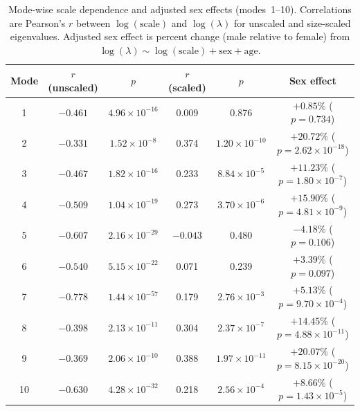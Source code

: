 \documentclass[openacc]{rsproca_new}
\begin{document}
\begin{table}[p]
\centering
\caption{Mode-wise scale dependence and adjusted sex effects (modes~1--10). Correlations are Pearson's $r$ between $\log(\mathrm{scale})$ and $\log(\lambda)$ for unscaled and size-scaled eigenvalues. Adjusted sex effect is percent change (male relative to female) from $\log(\lambda) \sim \log(\mathrm{scale}) + \mathrm{sex} + \mathrm{age}$.}
\label{tab:modes}
\begin{tabular}{cccccc}
\toprule
Mode & $r$ (unscaled) & $p$ & $r$ (scaled) & $p$ & Sex effect \\
\midrule
1 & $-0.461$ & $4.96 \times 10^{-16}$ & 0.009 & 0.876 & $+0.85\%$ ($p=0.734$) \\
2 & $-0.331$ & $1.52 \times 10^{-8}$ & 0.374 & $1.20 \times 10^{-10}$ & $+20.72\%$ ($p=2.62 \times 10^{-18}$) \\
3 & $-0.467$ & $1.82 \times 10^{-16}$ & 0.233 & $8.84 \times 10^{-5}$ & $+11.23\%$ ($p=1.80 \times 10^{-7}$) \\
4 & $-0.509$ & $1.04 \times 10^{-19}$ & 0.273 & $3.70 \times 10^{-6}$ & $+15.90\%$ ($p=4.81 \times 10^{-9}$) \\
5 & $-0.607$ & $2.16 \times 10^{-29}$ & $-0.043$ & 0.480 & $-4.18\%$ ($p=0.106$) \\
6 & $-0.540$ & $5.15 \times 10^{-22}$ & 0.071 & 0.239 & $+3.39\%$ ($p=0.097$) \\
7 & $-0.778$ & $1.44 \times 10^{-57}$ & 0.179 & $2.76 \times 10^{-3}$ & $+5.13\%$ ($p=9.70 \times 10^{-4}$) \\
8 & $-0.398$ & $2.13 \times 10^{-11}$ & 0.304 & $2.37 \times 10^{-7}$ & $+14.45\%$ ($p=4.88 \times 10^{-11}$) \\
9 & $-0.369$ & $2.06 \times 10^{-10}$ & 0.388 & $1.97 \times 10^{-11}$ & $+20.07\%$ ($p=8.15 \times 10^{-20}$) \\
10 & $-0.630$ & $4.28 \times 10^{-32}$ & 0.218 & $2.56 \times 10^{-4}$ & $+8.66\%$ ($p=1.43 \times 10^{-5}$) \\
\bottomrule
\end{tabular}
\end{table}
\end{document}
